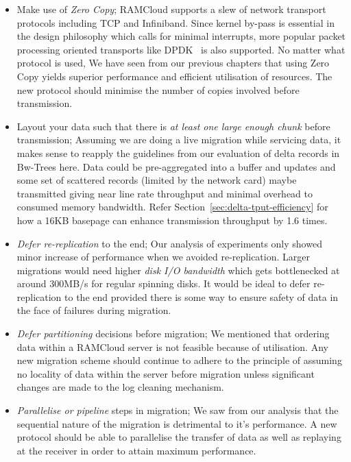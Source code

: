 \begin{itemize}
\item Make use of {\em Zero Copy}; RAMCloud supports a slew of network transport protocols including TCP and Infiniband. Since kernel by-pass is essential in the design philosophy which calls for minimal 
interrupts, more popular packet processing oriented transports like DPDK~\cite{dpdk} is also supported. No matter what protocol is used, We have seen from our previous chapters that 
using Zero Copy yields superior performance and efficient utilisation of resources. The new protocol should minimise the number of copies involved before transmission.

\item Layout your data such that there is {\em at least one large enough chunk} before transmission; Assuming we are doing a live migration while servicing data, it makes sense to reapply the guidelines 
from our evaluation of delta records in Bw-Trees here. Data could be pre-aggregated into a buffer
 and updates and some set of scattered records (limited by the network card) maybe 
 transmitted giving near line rate throughput and minimal overhead to consumed 
 memory bandwidth. Refer Section~\ref{sec:delta-tput-efficiency} for how a 16KB 
 basepage can enhance transmission throughput by 1.6 times.

\item {\em Defer re-replication} to the end; Our analysis of experiments only showed minor increase of performance when we avoided re-replication. Larger migrations would need higher {\em disk I/O bandwidth} which gets bottlenecked at around 
300MB/s for regular spinning disks. It would be ideal to defer re-replication to the end provided there is some way to ensure safety of data in the face of failures during migration.

\item {\em Defer partitioning} decisions before migration; We mentioned that ordering data within a RAMCloud server is not feasible because of utilisation. Any new migration scheme should continue to adhere to the principle of assuming no locality 
of data within the server before migration unless significant changes are made to the log cleaning mechanism.

\item {\em Parallelise or pipeline} steps in migration; We saw from our analysis that the sequential nature of the migration is detrimental to it's performance. A new protocol should be 
able to parallelise the transfer of data as well as replaying at the receiver in order to attain maximum performance. 

\end{itemize}

